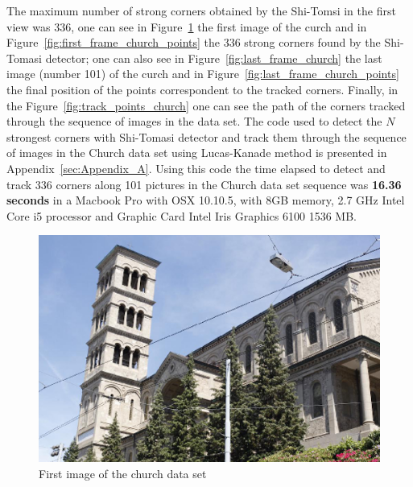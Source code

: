 The maximum number of strong corners obtained by the Shi-Tomsi in the first view was 336, one can see in Figure~\ref{fig:first_frame_church} the first image of the curch and in Figure~\ref{fig:first_frame_church_points} the 336 strong corners found by the Shi-Tomasi detector; one can also see in Figure~\ref{fig:last_frame_church} the last image (number 101) of the curch and in Figure~\ref{fig:last_frame_church_points} the final position of the points correspondent to the tracked corners. Finally, in the Figure~\ref{fig:track_points_church} one can see the path of the corners tracked through the sequence of images in the data set. The code used to detect the $N$ strongest corners with Shi-Tomasi detector and track them through the sequence of images in the Church data set using Lucas-Kanade method is presented in Appendix~\ref{sec:Appendix_A}. Using this code the time elapsed to detect and track 336 corners along 101 pictures in the Church data set sequence was \textbf{16.36 seconds} in a Macbook Pro with OSX 10.10.5, with 8GB memory, 2.7 GHz Intel Core i5 processor and Graphic Card Intel Iris Graphics 6100 1536 MB. 

\begin{figure}[h!]
\centering
\includegraphics[width=1 \textwidth]{./Diagrams/first_frame_church.png}
\caption{First image of the church data set}
\label{fig:first_frame_church}
\end{figure}

